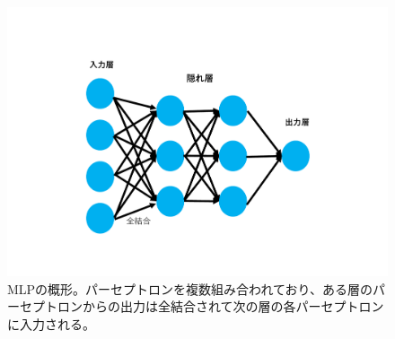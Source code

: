 \begin{figure}[tb]
  \centering
  \includegraphics[clip, width=13cm]{fig/4/MLP_re.pdf}
  \caption{MLPの概形。パーセプトロンを複数組み合われており、ある層のパーセプトロンからの出力は全結合されて次の層の各パーセプトロンに入力される。}
  \label{fig:MLP}
\end{figure}

